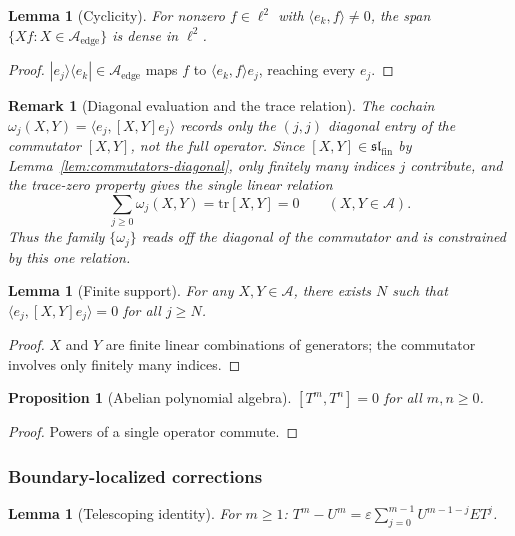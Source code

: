 \documentclass[10pt]{amsart}
\newcommand{\1}{{\mathbb{I}}}
\newtheorem{prop}[theorem]{Proposition}
\newtheorem{lemma}[theorem]{Lemma}
\newtheorem{remark}[theorem]{Remark}
\numberwithin{equation}{section}
\begin{document}
\begin{lemma}[Cyclicity]\label{lem:irreducible}
For nonzero $f \in \ell^2$ with $\langle e_k,f\rangle \ne 0$, the span
$\{Xf : X \in \mathcal{A}_{\mathrm{edge}}\}$ is dense in $\ell^2$.
\end{lemma}
\begin{proof}
$|e_j\rangle\langle e_k| \in \mathcal{A}_{\mathrm{edge}}$ maps $f$ to $\langle e_k,f\rangle e_j$,
reaching every $e_j$.
\end{proof}

\begin{remark}[Diagonal evaluation and the trace relation]\label{rem:diagonal-eval}
The cochain $\omega_j(X,Y) = \langle e_j,[X,Y]e_j\rangle$ records only the $(j,j)$ diagonal
entry of the commutator $[X,Y]$, not the full operator. Since $[X,Y]\in\mathfrak{sl}_{\mathrm{fin}}$
by Lemma~\ref{lem:commutators-diagonal}, only finitely many indices $j$ contribute, and the
trace-zero property gives the single linear relation
\[
\sum_{j\ge0}\omega_j(X,Y) = \mathrm{tr}[X,Y] = 0
\qquad (X,Y\in\mathcal{A}).
\]
Thus the family $\{\omega_j\}$ reads off the diagonal of the commutator and is constrained by
this one relation.
\end{remark}

\begin{lemma}[Finite support]\label{lem:finite-support}
For any $X, Y \in \mathcal{A}$, there exists $N$ such that $\langle e_j,[X,Y]e_j\rangle = 0$
for all $j \ge N$.
\end{lemma}

\begin{proof}
$X$ and $Y$ are finite linear combinations of generators; the commutator involves only finitely
many indices.
\end{proof}

\begin{prop}[Abelian polynomial algebra]\label{prop:polyT}
$[T^m, T^n] = 0$ for all $m,n \ge 0$.
\end{prop}

\begin{proof}
Powers of a single operator commute.
\end{proof}

\subsubsection{Boundary-localized corrections}

\begin{lemma}[Telescoping identity]\label{lem:telescope}
For $m \ge 1$: $T^m - U^m = \varepsilon \sum_{j=0}^{m-1} U^{m-1-j} E T^j$.
\end{lemma}
\end{document}
